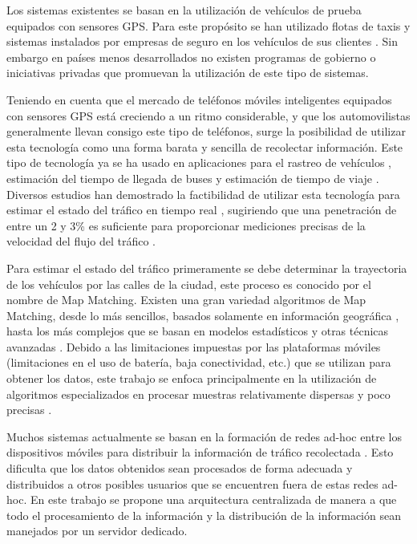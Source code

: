 Los sistemas existentes se basan en la utilización de vehículos de prueba equipados con sensores GPS. Para este propósito se han utilizado flotas de taxis \cite{schafer2002traffic,reinthaler2007evaluation} y sistemas instalados por empresas de seguro en los vehículos de sus clientes \cite{giovannini2011novel}. Sin embargo en países menos desarrollados no existen programas de gobierno o iniciativas privadas que promuevan la utilización de este tipo de sistemas.

Teniendo en cuenta que el mercado de teléfonos móviles inteligentes equipados con sensores GPS está creciendo a un ritmo considerable, y que los automovilistas generalmente llevan consigo este tipo de teléfonos, surge la posibilidad de utilizar esta tecnología como una forma barata y sencilla de recolectar información. Este tipo de tecnología ya se ha usado en aplicaciones para el rastreo de vehículos \cite{thiagarajan2010cooperative}, estimación del tiempo de llegada de buses \cite{zhou2012long} y estimación de tiempo de viaje \cite{thiagarajan2009vtrack}. Diversos estudios han demostrado la factibilidad de utilizar esta tecnología para estimar el estado del tráfico en tiempo real \cite{tao2012real,herrera2010evaluation}, sugiriendo que una penetración de entre un 2 y 3\% es suficiente para proporcionar mediciones precisas de la velocidad del flujo del tráfico \cite{herrera2010evaluation}.

Para estimar el estado del tráfico primeramente se debe determinar la trayectoria de los vehículos por las calles de la ciudad, este proceso es conocido por el nombre de Map Matching. Existen una gran variedad algoritmos de Map Matching, desde lo más sencillos, basados solamente en información geográfica \cite{white2000some}, hasta los más complejos que se basan en modelos estadísticos y otras técnicas avanzadas \cite{quddus2006high,kim2001adaptive}. Debido a las limitaciones impuestas por las plataformas móviles (limitaciones en el uso de batería, baja conectividad, etc.) que se utilizan para obtener los datos, este trabajo se enfoca principalmente en la utilización de algoritmos especializados en procesar muestras relativamente dispersas y poco precisas \cite{lou2009map}.

Muchos sistemas actualmente se basan en la formación de redes ad-hoc entre los dispositivos móviles para distribuir la información de tráfico recolectada \cite{zhong2008disseminating,leontiadis2011effectiveness}. Esto dificulta que los datos obtenidos sean procesados de forma adecuada y distribuidos a otros posibles usuarios que se encuentren fuera de estas redes ad-hoc. En este trabajo se propone una arquitectura centralizada de manera a que todo el procesamiento de la información y la distribución de la información sean manejados por un servidor dedicado.

